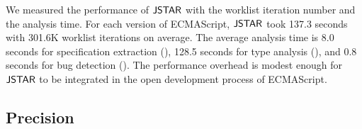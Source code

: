 We measured the performance of $\tool$ with the worklist iteration number
and the analysis time.  For each version of ECMAScript,
$\tool$ took 137.3 seconds with 301.6K worklist iterations
on average.  The average analysis time is 8.0 seconds
for specification extraction (),
128.5 seconds for type analysis (), and
0.8 seconds for bug detection ().
The performance overhead is modest enough for $\tool$ to be integrated
in the open development process of ECMAScript.

\subsection{Precision}\label{sec:precision}

% 
% 
% 

